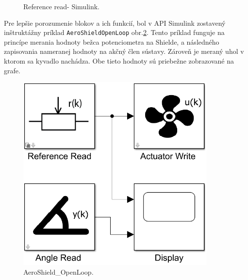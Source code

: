 \begin{figure}[!tbh]
	\hfill
	\hfill
	\hfill
	\caption{Reference read- Simulink.}\label{OBRAZOK 2.6.100}
\end{figure}



Pre lepšie porozumenie blokov a ich funkcií, bol v API Simulink zostavený inštruktážny príklad \verb|AeroShieldOpenLoop| obr.\ref{OBRAZOK 2.6.111}. Tento príklad funguje na princípe merania hodnoty bežca potenciometra na Shielde, a následného zapisovania nameranej hodnoty na akčný člen sústavy. Zároveň je meraný uhol v ktorom sa kyvadlo nachádza. Obe tieto hodnoty sú priebežne zobrazované na grafe. 

\begin{figure}[!tbh]
	\centering
	\includegraphics[width=100mm]{obr/AeroOpenLoop.png}
	\caption{AeroShield\_OpenLoop.}\label{OBRAZOK 2.6.111}
\end{figure}

